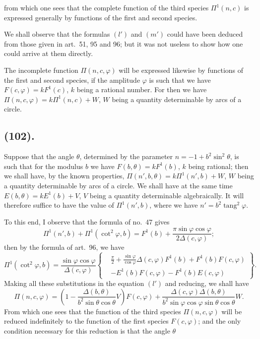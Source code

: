 \documentclass{article}
\begin{document}
from which one sees that the complete function of the third species $\Pi^{1}(n,c)$ is expressed generally by functions of the first and second species.

We shall observe that the formulas $(l')$ and $(m')$ could have been deduced from those given in art.\ 51, 95 and 96; but it was not useless to show how one could arrive at them directly.

The incomplete function $\Pi(n,c,\varphi)$ will be expressed likewise by functions of the first and second species, if the amplitude $\varphi$ is such that we have $F(c,\varphi)=kF^{1}(c)$, $k$ being a rational number. For then we have $\Pi(n,c,\varphi)=k\Pi^{1}(n,c)+W$, $W$ being a quantity determinable by arcs of a circle.

\subsection*{(102).}

Suppose that the angle $\theta$, determined by the parameter $n=-1+b^{2}\sin^{2}\theta$, is such that for the modulus $b$ we have $F(b,\theta)=kF^{1}(b)$, $k$ being rational; then we shall have, by the known properties, $\Pi(n',b,\theta)=k\Pi^{1}(n',b)+W$, $W$ being a quantity determinable by arcs of a circle. We shall have at the same time $E(b,\theta)=kE^{1}(b)+V$, $V$ being a quantity determinable algebraically. It will therefore suffice to have the value of $\Pi^{1}(n',b)$, where we have $n'=b^{2}\operatorname{tang}^{2}\varphi$.

To this end, I observe that the formula of no.\ 47 gives
\[ \Pi^{1}(n',b)+\Pi^{1}(\cot^{2}\varphi,b)=F^{1}(b)+\frac{\pi\sin\varphi\cos\varphi}{2\Delta(c,\varphi)}; \]
then by the formula of art.\ 96, we have
\[ \Pi^{1}(\cot^{2}\varphi,b)=\frac{\sin\varphi\cos\varphi}{\Delta(c,\varphi)}\left\{\begin{aligned} &\frac{\pi}{2}+\frac{\sin\varphi}{\cos\varphi}\Delta(c,\varphi)F^{1}(b)+F^{1}(b)F(c,\varphi)\\ &-E^{1}(b)F(c,\varphi)-F^{1}(b)E(c,\varphi) \end{aligned}\right\}. \]
Making all these substitutions in the equation $(l')$ and reducing, we shall have
\[ \Pi(n,c,\varphi)=\left(1-\frac{\Delta(b,\theta)}{b^{2}\sin\theta\cos\theta}V\right)F(c,\varphi)+\frac{\Delta(c,\varphi)\Delta(b,\theta)}{b^{2}\sin\varphi\cos\varphi\sin\theta\cos\theta}W. \]
From which one sees that the function of the third species $\Pi(n,c,\varphi)$ will be reduced indefinitely to the function of the first species $F(c,\varphi)$; and the only condition necessary for this reduction is that the angle $\theta$
\end{document}
